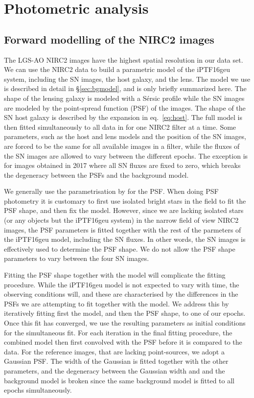 \documentclass[a4paper,fleqn,usenatbib]{mnras}
\newcommand{\geu}{iPTF16geu\xspace}
\newcommand{\sn}{SN\xspace}
\begin{document}
\section{Photometric analysis}
\label{sec:photometry}
\subsection{Forward modelling of the NIRC2 images}\label{sec:nirc2}
The LGS-AO NIRC2 images have the highest spatial resolution in our data set.  We can use the NIRC2 data to build a 
parametric model of the \geu system, including the \sn images, the host galaxy, and the lens.  The model we use is 
described in detail in \S\ref{sec:bgmodel}, and is only briefly summarized here. The shape of the lensing galaxy is modeled 
with a S\'ersic profile \citep{1963BAAA....6...41S} while the \sn images are 
modeled by the point-spread function (PSF) of the images.  The shape of the \sn host galaxy is described by the expansion 
in eq.~\eqref{eq:host}.  The full model is then fitted simultaneously to all data in for one NIRC2 filter 
at a time.  Some parameters,  such as the host and lens models and the position of the \sn images, are forced to be 
the same for all available images in a filter, while the fluxes of the \sn images are allowed to vary between the 
different epochs.  The exception is for images obtained in 2017 where all \sn fluxes are fixed to zero, which breaks the 
degeneracy between the PSFs and the background model.

We generally use the parametrisation by \citet{1969A&A.....3..455M} for the PSF.  When doing PSF photometry it is customary 
to first use isolated bright stars in the field to fit the PSF shape, and then fix the model.  However, since we are lacking 
isolated stars (or any objects but the \geu system) in the narrow field of view NIRC2 images, the PSF parameters is fitted 
together with the rest of the parmeters of the \geu model, including the \sn fluxes.  In other words, the \sn images is effectively 
used to determine the PSF shape.  We do not allow the PSF shape parameters to vary between the four \sn images.

Fitting the PSF shape together with the model will complicate the fitting procedure.  While the \geu model is not expected to vary with
time, the observing conditions will, and these are characterised by the differences in the PSFs we are attempting to fit together 
with the model.  We address this by iteratively fitting first the model, and then the PSF shape, to one of our epochs.  Once this fit has
converged, we use the resulting parameters as initial conditions for the simultaneous fit.  For each iteration in the final 
fitting procedure, the combined model then first convolved with the PSF before it is compared to the data.   For the reference 
images, that are lacking point-sources, we adopt a Gaussian PSF.  The width of the Gaussian is fitted together with the 
other parameters, and the degeneracy between the Gaussian width and and the background model is broken since the same 
background model is fitted to all epochs simultaneously. 
\end{document}
